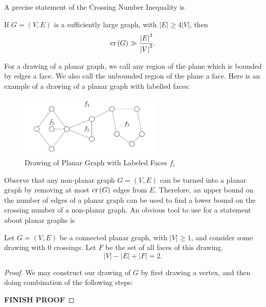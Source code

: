 \documentclass[12pt]{amsart}
\begin{document}
A precise statement of the Crossing Number Inequality is

\begin{theorem}\label{thm:crossing-number-inequality}
    If \(G = (V,E)\) is a sufficiently large graph, with \(\left\lvert E \right\rvert \geq 4 \left\lvert V \right\rvert \),
    then
    \[
        \operatorname{cr}\left( G \right) \gg \frac{\left\lvert E \right\rvert ^{3} }{\left\lvert V \right\rvert ^{2}}  
    .\]
\end{theorem}

For a drawing of a planar graph, we call any region of the plane which is bounded by edges a face. We also call
the unbounded region of the plane a face. Here is an example of a drawing of a planar
graph with labelled faces:

\begin{figure}[h]
    \centering
    \includegraphics[width=0.6\textwidth]{faceimage.png}
    \caption{Drawing of Planar Graph with Labeled Faces \(f_{i} \)}
\end{figure}

Observe that any non-planar graph \(G = (V,E)\) can be turned into a planar graph by removing at most
\(\operatorname{cr}\left( G \right) \) edges from \(E\). Therefore, an upper bound on the number of edges of a
planar graph can be used to find a lower bound on the crossing number of a non-planar graph.
An obvious tool to use for a statement about planar graphs is

\begin{theorem}\label{thm:euler-formula-graphs}
Let \(G = (V,E)\) be a connected planar graph, with \(\left\lvert V \right\rvert \geq 1\), and consider some drawing with 0 crossings.
Let \(F\) be the set of all faces of this drawing.
\[
    \left\lvert V \right\rvert - \left\lvert E \right\rvert + \left\lvert F \right\rvert = 2
.\]
\end{theorem}

\begin{proof}
We may construct our drawing of \(G\) by first drawing a vertex, and then doing combination of the following steps: 

\textbf{FINISH PROOF}
\end{proof}
\end{document}
